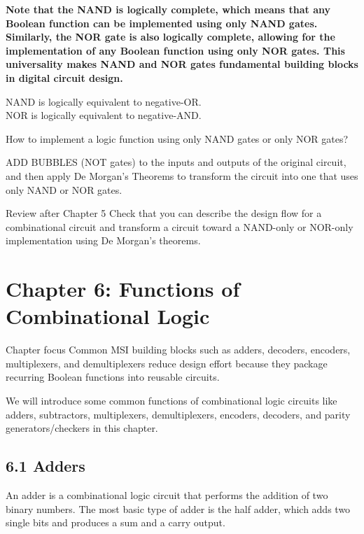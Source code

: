 \documentclass[11pt,a4paper]{article}
\begin{document}
\textbf{Note that the NAND is logically complete, which means that any
Boolean function can be implemented using only NAND gates. Similarly,
the NOR gate is also logically complete, allowing for the implementation
of any Boolean function using only NOR gates. This universality makes
NAND and NOR gates fundamental building blocks in digital circuit
design.}

NAND is logically equivalent to negative-OR.\\
NOR is logically equivalent to negative-AND.

How to implement a logic function using only NAND gates or only NOR
gates?

ADD BUBBLES (NOT gates) to the inputs and outputs of the original
circuit, and then apply De Morgan's Theorems to transform the circuit
into one that uses only NAND or NOR gates.

\begin{notebox}{Review after Chapter 5}
Check that you can describe the design flow for a combinational circuit and transform a circuit toward a NAND-only or NOR-only implementation using De Morgan's theorems.
\end{notebox}

\section{Chapter 6: Functions of Combinational
Logic}\label{chapter-6-functions-of-combinational-logic}

\begin{chapterbox}{Chapter focus}
Common MSI building blocks such as adders, decoders, encoders, multiplexers, and demultiplexers reduce design effort because they package recurring Boolean functions into reusable circuits.
\end{chapterbox}

We will introduce some common functions of combinational logic circuits
like adders, subtractors, multiplexers, demultiplexers, encoders,
decoders, and parity generators/checkers in this chapter.

\subsection{6.1 Adders}\label{adders}

An adder is a combinational logic circuit that performs the addition of
two binary numbers. The most basic type of adder is the half adder,
which adds two single bits and produces a sum and a carry output.
\end{document}
